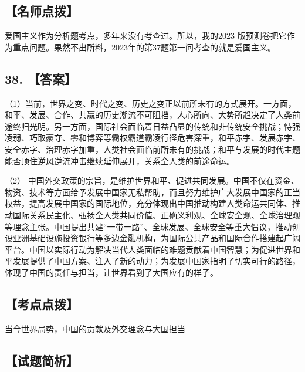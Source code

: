 \documentclass[UTF8,11pt]{ctexart}
\begin{document}
\subsection*{【名师点拨】}

爱国主义作为分析题考点，多年来没有考查过。所以，我的2023 版预测卷把它作为重点问题。果然不出所料，2023年的第37题第一问考查的就是爱国主义。


\subsection*{38. 【答案】}

（1）当前，世界之变、时代之变、历史之变正以前所未有的方式展开。一方面，和平、发展、合作、共赢的历史潮流不可阻挡，人心所向、大势所趋决定了人类前途终归光明。另一方面，国际社会面临着日益凸显的传统和非传统安全挑战；恃强凌弱、巧取豪夺、零和博弈等霸权霸道霸凌行径危害深重，和平赤字、发展赤字、安全赤字、治理赤字加重，人类社会面临前所未有的挑战；和平与发展的时代主题能否顶住逆风逆流冲击继续延伸展开，关系全人类的前途命运。


（2） 中国外交政策的宗旨，是维护世界和平、促进共同发展。中国不仅在资金、物资、技术等方面给予发展中国家无私帮助，而且努力维护广大发展中国家的正当权益，提高发展中国家的国际地位，充分体现出中国推动构建人类命运共同体、推动国际关系民主化、弘扬全人类共同价值、正确义利观、全球安全观、全球治理观等理念主张。中国提出共建“一带一路”、全球发展、全球安全等重大倡议，推动创设亚洲基础设施投资银行等多边金融机构，为国际公共产品和国际合作搭建起广阔平台。中国以实际行动为解决当代人类面临的难题贡献着中国智慧；为促进世界和平发展提供了中国方案、注入了新的动力；为发展中国家指明了切实可行的路径，体现了中国的责任与担当，让世界看到了大国应有的样子。


\subsection*{【考点点拨】}

当今世界局势，中国的贡献及外交理念与大国担当


\subsection*{【试题简析】}
\end{document}
